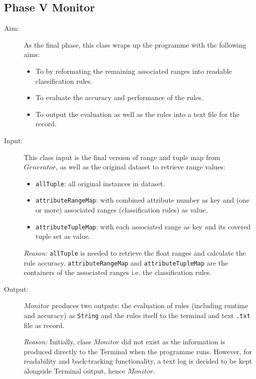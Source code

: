 \subsection{Phase V Monitor}
\begin{description}

\item[Aim: ] As the final phase, this class wraps up the programme with the following aims:

\begin{itemize}
	\item{To by reformating the remaining associated ranges into readable classification rules.} 
	\item{To evaluate the accuracy and performance of the rules.} 
	\item{To output the evaluation as well as the rules into a text file for the record.} 
\end{itemize}

\item[Input: ] This class input is the final version of range and tuple map from $Generator$, as well as the original dataset to retrieve range values:
\begin{itemize}
	\item{\texttt{allTuple}:  all original instances in dataset.} 
	\item{\texttt{attributeRangeMap}: with combined attribute number as key and (one or more) associated ranges (classification rules) as value.}
	\item{\texttt{attributeTupleMap}: with each associated range as key and its covered tuple set as value.}
\end{itemize}

\textit{Reason: } \texttt{allTuple} is needed to retrieve the float ranges and calculate the rule accuracy. \texttt{attributeRangeMap} and \texttt{attributeTupleMap} are the containers of the associated ranges i.e. the classification rules.

\item[Output: ] $Monitor$ produces two outputs: the evaluation of rules (including runtime and accuracy) as \texttt{String} and the rules itself to the terminal and text \texttt{.txt} file as record. 
  
\textit{Reason: } Initially, class $Monitor$ did not exist as the information is produced directly to the Terminal when the programme runs. However, for readability and back-tracking functionality, a text log is decided to be kept alongside Terminal output, hence $Monitor$.  


\end{description}
